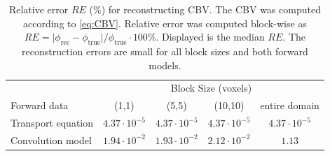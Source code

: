 \documentclass[paper=a4, fontsize=11pt,parskip=half,headings=small]{scrartcl}
\begin{document}
	\begin{table}[H]
		\caption{Relative error $RE$ (\%) for reconstructing CBV. The CBV was computed according to \eqref{eq:CBV}. Relative error was computed block-wise as $RE = \vert \phi_{\mathrm{rec}} - \phi_{\mathrm{true}}\vert / \phi_{\mathrm{true}}\cdot 100\%$. Displayed is the median $RE$. The reconstruction errors are small for all block sizes and both forward models. }
		\centering
		\begin{tabular}{l c c c c }
			 & \multicolumn{4}{c}{Block Size (voxels)}\\
			Forward data 		& (1,1) 	& (5,5)		& (10,10)	& entire domain \\
			\toprule
			Transport equation  & $4.37\cdot10^{-5}$      & $4.37\cdot10^{-5}$		& $4.37\cdot10^{-5}$		& $4.37\cdot10^{-5}$ \\											
			Convolution model  & $1.94\cdot10^{-2}$   & $1.93\cdot10^{-2}$		& $2.12\cdot10^{-2}$		& $1.13$ 			
		\end{tabular}
		\label{tab:resultsSimphi}
	\end{table}
\end{document}
